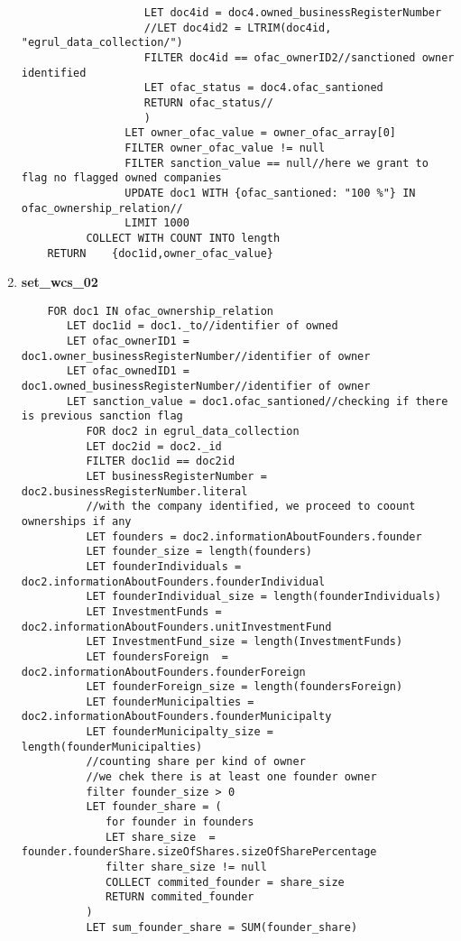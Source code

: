 \begin{enumerate}
\begin{verbatim}
	               LET doc4id = doc4.owned_businessRegisterNumber
	               //LET doc4id2 = LTRIM(doc4id, "egrul_data_collection/") 
	               FILTER doc4id == ofac_ownerID2//sanctioned owner identified
	               LET ofac_status = doc4.ofac_santioned
	               RETURN ofac_status//
	               )
	            LET owner_ofac_value = owner_ofac_array[0]
	            FILTER owner_ofac_value != null 
	            FILTER sanction_value == null//here we grant to flag no flagged owned companies
	            UPDATE doc1 WITH {ofac_santioned: "100 %"} IN ofac_ownership_relation//
	            LIMIT 1000
	      COLLECT WITH COUNT INTO length
	RETURN    {doc1id,owner_ofac_value}
	\end{verbatim}
	
		\item \textbf{set\_wcs\_02}\label{query12}
	\begin{verbatim}
	FOR doc1 IN ofac_ownership_relation
	   LET doc1id = doc1._to//identifier of owned
	   LET ofac_ownerID1 = doc1.owner_businessRegisterNumber//identifier of owner
	   LET ofac_ownedID1 = doc1.owned_businessRegisterNumber//identifier of owner
	   LET sanction_value = doc1.ofac_santioned//checking if there is previous sanction flag
	      FOR doc2 in egrul_data_collection
	      LET doc2id = doc2._id
	      FILTER doc1id == doc2id
	      LET businessRegisterNumber = doc2.businessRegisterNumber.literal
	      //with the company identified, we proceed to coount ownerships if any
	      LET founders = doc2.informationAboutFounders.founder
	      LET founder_size = length(founders)
	      LET founderIndividuals = doc2.informationAboutFounders.founderIndividual
	      LET founderIndividual_size = length(founderIndividuals)
	      LET InvestmentFunds = doc2.informationAboutFounders.unitInvestmentFund
	      LET InvestmentFund_size = length(InvestmentFunds)
	      LET foundersForeign  = doc2.informationAboutFounders.founderForeign
	      LET founderForeign_size = length(foundersForeign)
	      LET founderMunicipalties = doc2.informationAboutFounders.founderMunicipalty
	      LET founderMunicipalty_size = length(founderMunicipalties)
	      //counting share per kind of owner
	      //we chek there is at least one founder owner 
	      filter founder_size > 0
	      LET founder_share = (
	         for founder in founders
	         LET share_size  = founder.founderShare.sizeOfShares.sizeOfSharePercentage
	         filter share_size != null
	         COLLECT commited_founder = share_size
	         RETURN commited_founder
	      )
	      LET sum_founder_share = SUM(founder_share)

\end{verbatim}
\end{enumerate}
